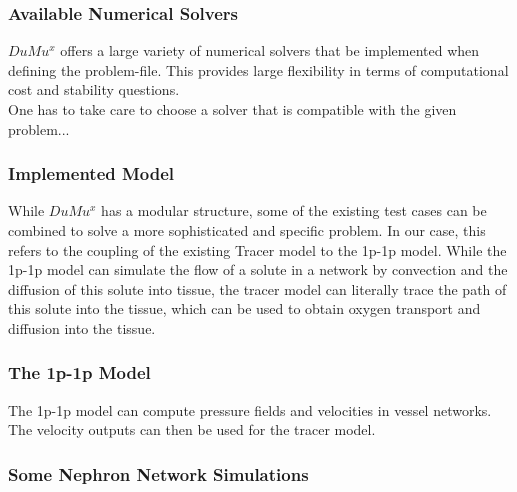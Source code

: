 \subsubsection*{Available Numerical Solvers}

$DuMu^x$ offers a large variety of numerical solvers that be implemented when defining the problem-file. This provides large flexibility in terms of computational cost and stability questions. \cite{flemischdumux}
\\One has to take care to choose a solver that is compatible with the given problem...

\subsubsection{Implemented Model}

While $DuMu^x$ has a modular structure, some of the existing test cases can be combined to solve a more sophisticated and specific problem. In our case, this refers to the coupling of the existing Tracer model to the 1p-1p model. While the 1p-1p model can simulate the flow of a solute in a network by convection and the diffusion of this solute into tissue, the tracer model can literally trace the path of this solute into the tissue, which can be used to obtain oxygen transport and diffusion into the tissue.

\subsubsection*{The 1p-1p Model}

The 1p-1p model can compute pressure fields and velocities in vessel networks. The velocity outputs can then be used for the tracer model.

\subsubsection*{\footnotesize Some Nephron Network Simulations}

